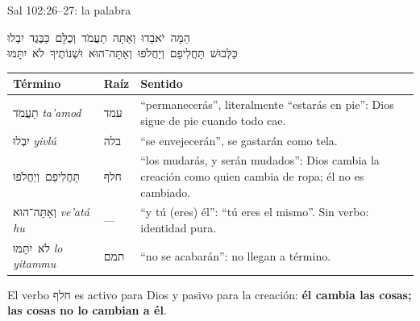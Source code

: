 \documentclass[hyperref={bookmarks=false},aspectratio=169]{beamer}
\newcommand{\heb}[1]{\mbox{\foreignlanguage{hebrew}{#1}}}
\newcommand{\destacar}[1]{\textbf{\textcolor{azul}{#1}}}
\begin{document}
\begin{frame}{Sal 102:26--27: la palabra}
\begin{center}\heb{הֵמָּה יֹאבֵדוּ וְאַתָּה תַעֲמֹד וְכֻלָּם כַּבֶּגֶד יִבְלוּ}\\[2pt]\heb{כַּלְּבוּשׁ תַּחֲלִיפֵם וְיַחֲלֹפוּ וְאַתָּה־הוּא וּשְׁנוֹתֶיךָ לֹא יִתָּמּוּ}\end{center}
\scriptsize\renewcommand{\arraystretch}{1.13}
\begin{tabular}{@{}>{\RaggedRight\arraybackslash}p{2.9cm}>{\RaggedRight\arraybackslash}p{1.1cm}>{\RaggedRight\arraybackslash}p{7.9cm}@{}}
\toprule
\textbf{Término} & \textbf{Raíz} & \textbf{Sentido} \\ \midrule
\heb{תַעֲמֹד} \emph{ta'amod} & \heb{עמד} & ``permanecerás'', literalmente ``estarás en pie'': Dios sigue de pie cuando todo cae. \\
\heb{יִבְלוּ} \emph{yivlú} & \heb{בלה} & ``se envejecerán'', se gastarán como tela. \\
\heb{תַּחֲלִיפֵם וְיַחֲלֹפוּ} & \heb{חלף} & ``los mudarás, y serán mudados'': Dios cambia la creación como quien cambia de ropa; él no es cambiado. \\
\heb{וְאַתָּה־הוּא} \emph{ve'atá hu} & --- & ``y tú (eres) él'': ``tú eres el mismo''. Sin verbo: identidad pura. \\
\heb{לֹא יִתָּמּוּ} \emph{lo yitammu} & \heb{תמם} & ``no se acabarán'': no llegan a término. \\
\bottomrule
\end{tabular}\par\smallskip
\small El verbo \heb{חלף} es activo para Dios y pasivo para la creación: \destacar{él cambia las cosas; las cosas no lo cambian a él}.
\end{frame}
\end{document}
